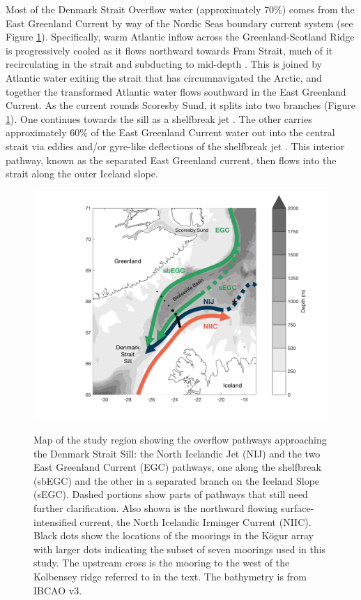\documentclass[12pt,titlepage,figuresatend]{article}
\begin{document}
Most of the Denmark Strait Overflow water (approximately 70\%) comes from the East Greenland Current by way of the Nordic Seas boundary current system \cite[]{Vage2013,Harden2016} (see Figure \ref{mainmap}). Specifically, warm Atlantic inflow across the Greenland-Scotland Ridge is progressively cooled as it flows northward towards Fram Strait, much of it recirculating in the strait and subducting to mid-depth \citep[]{Mauritzen1996}. This is joined by Atlantic water exiting the strait that has circumnavigated the Arctic, and together the transformed Atlantic water flows southward in the East Greenland Current.  As the current rounds Scoresby Sund, it splits into two branches (Figure \ref{mainmap}). One continues towards the sill as a shelfbreak jet \cite[]{Havik2017}. The other carries approximately 60\% of the East Greenland Current water out into the central strait via eddies and/or gyre-like deflections of the shelfbreak jet \cite[]{Vage2013,Harden2016}. This interior pathway, known as the separated East Greenland current, then flows into the strait along the outer Iceland slope. 


\begin{figure}[p!]
  \centering\includegraphics[width=\hsize]{./figures/mainmap.pdf}
  \caption{Map of the study region showing the overflow pathways approaching the Denmark Strait Sill: the North Icelandic Jet (NIJ) and the two East Greenland Current (EGC) pathways, one along the shelfbreak (sbEGC) and the other in a separated branch on the Iceland Slope (sEGC). Dashed portions show parts of pathways that still need further clarification. Also shown is the northward flowing surface-intensified current, the North Icelandic Irminger Current (NIIC). Black dots show the locations of the moorings in the K\"{o}gur array with larger dots indicating the subset of seven moorings used in this study. The upstream cross is the mooring to the west of the Kolbensey ridge referred to in the text. The bathymetry is from IBCAO v3.}{\label{mainmap}}
\end{figure}
\end{document}
